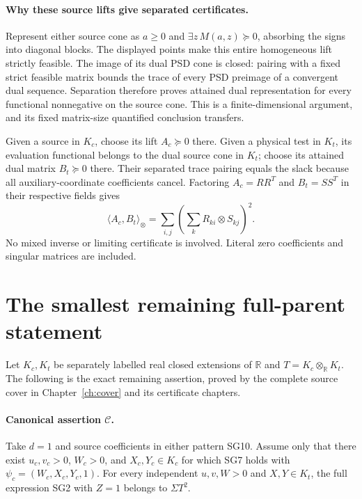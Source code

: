 \paragraph{Why these source lifts give separated certificates.}
Represent either source cone as $a\geq0$ and
$\exists z\,M(a,z)\succeq0$, absorbing the signs into diagonal
blocks.  The displayed points make this entire homogeneous lift
strictly feasible.  The image of its dual PSD cone is closed:
pairing with a fixed strict feasible matrix bounds the trace of
every PSD preimage of a convergent dual sequence.  Separation
therefore proves attained dual representation for every functional
nonnegative on the source cone.  This is a finite-dimensional
argument, and its fixed matrix-size quantified conclusion transfers.

Given a source in $K_c$, choose its lift $A_c\succeq0$ there.
Given a physical test in $K_t$, its evaluation functional belongs
to the dual source cone in $K_t$; choose its attained dual matrix
$B_t\succeq0$ there.  Their separated trace pairing equals the
slack because all auxiliary-coordinate coefficients cancel.
Factoring $A_c=RR^T$ and $B_t=SS^T$ in their respective fields gives
\[
 \langle A_c,B_t\rangle_{\otimes}
       =\sum_{i,j}\left(\sum_k R_{ki}\otimes S_{kj}\right)^2.
                                                               \tag{SG14}
\]
No mixed inverse or limiting certificate is involved.  Literal
zero coefficients and singular matrices are included.

\section{The smallest remaining full-parent statement}

Let $K_c,K_t$ be separately labelled real closed extensions of
$\mathbb R$ and $T=K_c\otimes_{\mathbb R}K_t$.
The following is the exact remaining assertion, proved by the complete
source cover in Chapter~\ref{ch:cover} and its certificate chapters.

\paragraph{Canonical assertion $\mathcal C$.}
Take $d=1$ and source coefficients in either pattern SG10.
Assume only that there exist $u_c,v_c>0$, $W_c>0$, and
$X_c,Y_c\in K_c$ for which SG7 holds with
$\psi_c=(W_c,X_c,Y_c,1)$.  For every independent
$u,v,W>0$ and $X,Y\in K_t$, the full expression SG2 with
$Z=1$ belongs to $\Sigma T^2$.

